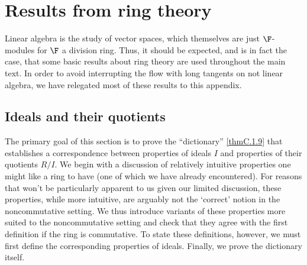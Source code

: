 \chapter{Results from ring theory}

Linear algebra is the study of vector spaces, which themselves are just $\F$-modules for $\F$ a division ring.  Thus, it should be expected, and is in fact the case, that some basic results about ring theory are used throughout the main text.  In order to avoid interrupting the flow with long tangents on not linear algebra, we have relegated most of these results to this appendix.

\section{Ideals and their quotients}

The primary goal of this section is to prove the ``dictionary'' \cref{thmC.1.9} that establishes a correspondence between properties of ideals $I$ and properties of their quotients $R/I$.  We begin with a discussion of relatively intuitive properties one might like a ring to have (one of which we have already encountered).  For reasons that won't be particularly apparent to us given our limited discussion, these properties, while more intuitive, are arguably not the `correct' notion in the noncommutative setting.  We thus introduce variants of these properties more suited to the noncommutative setting and check that they agree with the first definition if the ring is commutative.  To state these definitions, however, we must first define the corresponding properties of ideals.  Finally, we prove the dictionary itself.

